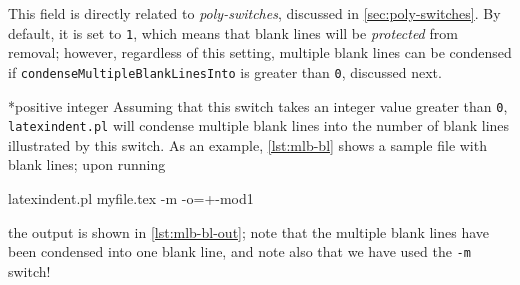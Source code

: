 	This field is directly related to \emph{poly-switches}, discussed in
	\cref{sec:poly-switches}. By default, it is set to \texttt{1}, which means that blank
	lines will be \emph{protected} from removal; however, regardless of this setting,
	multiple blank lines can be condensed if \texttt{condenseMultipleBlankLinesInto} is
	greater than \texttt{0}, discussed next.

*{positive integer}
	Assuming that this switch takes an integer value greater than \texttt{0},
	\texttt{latexindent.pl} will condense multiple blank lines into the number of blank lines
	illustrated by this switch. As an example, \cref{lst:mlb-bl} shows a sample file with
	blank lines; upon running
	\begin{commandshell}
latexindent.pl myfile.tex -m -o=+-mod1 
\end{commandshell}
	the output is shown in \cref{lst:mlb-bl-out}; note that the multiple blank lines have
	been condensed into one blank line, and note also that we have used the \texttt{-m}
	switch!

	\begin{cmhtcbraster}
	\end{cmhtcbraster}
